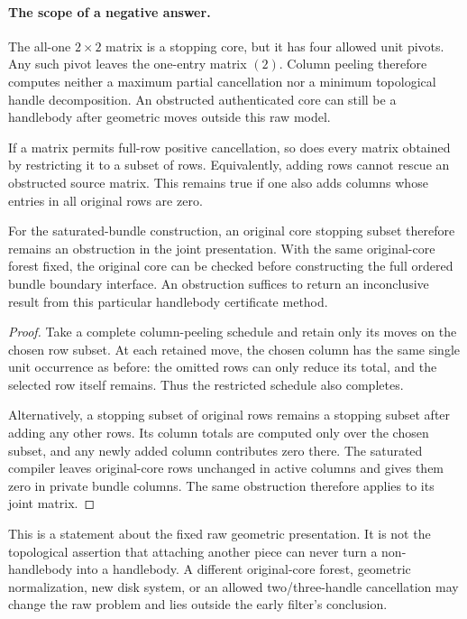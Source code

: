 \paragraph{The scope of a negative answer.}
The all-one $2\times2$ matrix is a stopping core, but it has four allowed
unit pivots.  Any such pivot leaves the one-entry matrix $(2)$.
Column peeling therefore computes neither a maximum partial cancellation nor
a minimum topological handle decomposition.  An obstructed authenticated
core can still be a handlebody after geometric moves outside this raw model.

\begin{corollary}
\label{cor:row-subset-monotonicity}
If a matrix permits full-row positive cancellation, so does every matrix
obtained by restricting it to a subset of rows.  Equivalently, adding rows
cannot rescue an obstructed source matrix.  This remains true if one also
adds columns whose entries in all original rows are zero.

For the saturated-bundle construction, an original core stopping subset
therefore remains an obstruction in the joint presentation.  With the same
original-core forest fixed, the original core can be checked before
constructing the full ordered bundle boundary interface.  An obstruction
suffices to return an inconclusive result from this particular handlebody
certificate method.
\end{corollary}
\begin{proof}
Take a complete column-peeling schedule and retain only its moves on the
chosen row subset.  At each retained move, the chosen column has the same
single unit occurrence as before: the omitted rows can only reduce its
total, and the selected row itself remains.  Thus the restricted schedule
also completes.

Alternatively, a stopping subset of original rows remains a stopping subset
after adding any other rows.  Its column totals are computed only over the
chosen subset, and any newly added column contributes zero there.  The
saturated compiler leaves original-core rows unchanged in active columns
and gives them zero in private bundle columns.  The same obstruction
therefore applies to its joint matrix.
\end{proof}

This is a statement about the fixed raw geometric presentation.  It is not
the topological assertion that attaching another piece can never turn a
non-handlebody into a handlebody.  A different original-core forest, geometric
normalization, new disk system, or an allowed two/three-handle cancellation
may change the raw problem and lies outside the early filter's conclusion.

